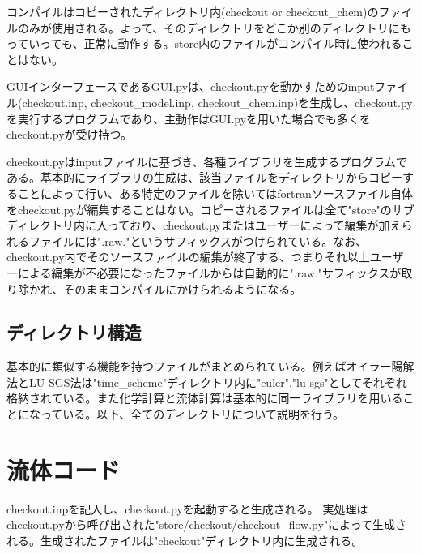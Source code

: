 \documentclass{jsarticle}
\begin{document}
コンパイルはコピーされたディレクトリ内(checkout or checkout\_chem)のファイルのみが使用される。よって、そのディレクトリをどこか別のディレクトリにもっていっても、正常に動作する。store内のファイルがコンパイル時に使われることはない。

GUIインターフェースであるGUI.pyは、checkout.pyを動かすためのinputファイル(checkout.inp, checkout\_model.inp, checkout\_chem.inp)を生成し、checkout.pyを実行するプログラムであり、主動作はGUI.pyを用いた場合でも多くをcheckout.pyが受け持つ。

checkout.pyはinputファイルに基づき、各種ライブラリを生成するプログラムである。基本的にライブラリの生成は、該当ファイルをディレクトリからコピーすることによって行い、ある特定のファイルを除いてはfortranソースファイル自体をcheckout.pyが編集することはない。コピーされるファイルは全て"store"のサブディレクトリ内に入っており、checkout.pyまたはユーザーによって編集が加えられるファイルには".raw."というサフィックスがつけられている。なお、checkout.py内でそのソースファイルの編集が終了する、つまりそれ以上ユーザーによる編集が不必要になったファイルからは自動的に".raw."サフィックスが取り除かれ、そのままコンパイルにかけられるようになる。
\subsection{ディレクトリ構造}
基本的に類似する機能を持つファイルがまとめられている。例えばオイラー陽解法とLU-SGS法は"time\_scheme"ディレクトリ内に"euler","lu-sgs"としてそれぞれ格納されている。また化学計算と流体計算は基本的に同一ライブラリを用いることになっている。以下、全てのディレクトリについて説明を行う。
\newpage
\section{流体コード}\label{流体コード}%
checkout.inpを記入し、checkout.pyを起動すると生成される。
実処理はcheckout.pyから呼び出された"store/checkout/checkout\_flow.py"によって生成される。生成されたファイルは"checkout"ディレクトリ内に生成される。
\end{document}
